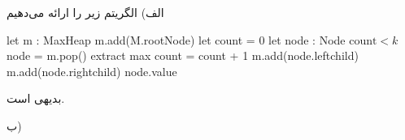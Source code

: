 الف)
الگریتم زیر را ارائه می‌دهیم

\begin{latin}
\begin{codebox}
		\li let m : MaxHeap
		\li m.add(M.rootNode)
		\li let count = 0
		\li let node : Node
		\li \While $\text{count} < k$ \Then
			\li node = m.pop() \Comment extract max
			\li count = count + 1
			\li m.add(node.leftchild)
			\li m.add(node.rightchild)
		\End
		\li \Return node.value
	\End
\end{codebox}
\end{latin}

\proof{}
بدیهی است.

ب)

